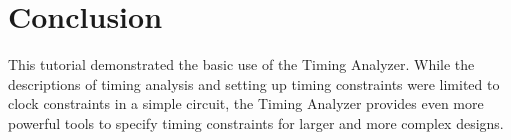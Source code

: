 \documentclass[11pt, twoside, pdftex]{article}
\newcommand{\commonPath}{../../../Common}
\begin{document}
\section{Conclusion}

This tutorial demonstrated the basic use of the Timing Analyzer. While the descriptions 
of timing analysis and setting up timing constraints were limited to clock constraints in a 
simple circuit, the Timing Analyzer provides even more powerful tools to specify timing constraints 
for larger and more complex designs.



\end{document}
